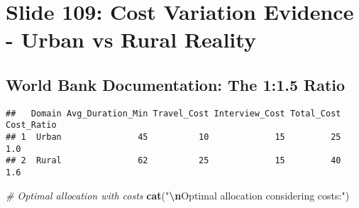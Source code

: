 \documentclass[
]{article}
\newenvironment{Shaded}{\begin{snugshade}}{\end{snugshade}}
\newcommand{\AttributeTok}[1]{\textcolor[rgb]{0.13,0.29,0.53}{#1}}
\newcommand{\CommentTok}[1]{\textcolor[rgb]{0.56,0.35,0.01}{\textit{#1}}}
\newcommand{\DecValTok}[1]{\textcolor[rgb]{0.00,0.00,0.81}{#1}}
\newcommand{\FunctionTok}[1]{\textcolor[rgb]{0.13,0.29,0.53}{\textbf{#1}}}
\newcommand{\NormalTok}[1]{#1}
\newcommand{\OtherTok}[1]{\textcolor[rgb]{0.56,0.35,0.01}{#1}}
\newcommand{\SpecialCharTok}[1]{\textcolor[rgb]{0.81,0.36,0.00}{\textbf{#1}}}
\newcommand{\StringTok}[1]{\textcolor[rgb]{0.31,0.60,0.02}{#1}}
\begin{document}
\section{Slide 109: Cost Variation Evidence - Urban vs Rural
Reality}\label{slide-109-cost-variation-evidence---urban-vs-rural-reality}

\subsection{World Bank Documentation: The 1:1.5
Ratio}\label{world-bank-documentation-the-11.5-ratio}

\begin{Shaded}
\end{Shaded}

\begin{verbatim}
##   Domain Avg_Duration_Min Travel_Cost Interview_Cost Total_Cost Cost_Ratio
## 1  Urban               45          10             15         25        1.0
## 2  Rural               62          25             15         40        1.6
\end{verbatim}

\begin{Shaded}
\begin{Highlighting}[]
\CommentTok{\# Optimal allocation with costs}
\FunctionTok{cat}\NormalTok{(}\StringTok{"}\SpecialCharTok{\textbackslash{}n}\StringTok{Optimal allocation considering costs:"}\NormalTok{)}
\end{Highlighting}
\end{Shaded}
\end{document}
